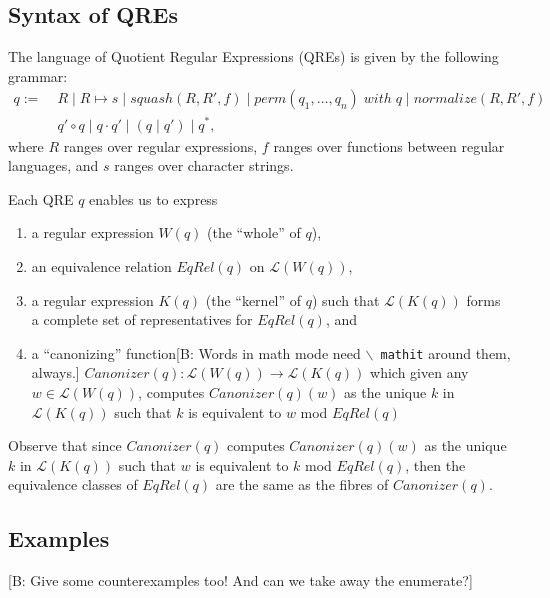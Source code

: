 \documentclass{svproc}
\newcommand{\FINISH}[3]{\ifdraft\textcolor{#1}{[#2: #3]}\fi}
\newcommand{\bcp}[1]{\FINISH{dkred}{B}{#1}}
\newcommand{\squash}[3]{\ensuremath{\mathit{squash}(#1, #2, #3)}}
\newcommand{\perm}[2]{\ensuremath{\mathit{perm}(#1)\; \mathit{with}\; #2}}
\newcommand{\normalize}[3]{\ensuremath{\mathit{normalize}(#1, #2, #3)}}
\newcommand{\sep}{\ensuremath{\; | \;}}
\begin{document}
  \subsection{Syntax of QREs}
The language of Quotient Regular Expressions (QREs) is given by the following
grammar:
\begin{align*}
q := \; &R \sep R \mapsto s \sep \squash{R}{R'}{f} \sep
\perm{q_1, \ldots, q_n}{q} \;  | \; \normalize{R}{R'}{f}\\
&q' \circ q \sep q \cdot q' \sep (q \sep q') \sep q^*,
\end{align*}
where $R$ ranges over regular expressions, $f$ ranges over functions between
regular languages, and $s$ ranges over character strings.

Each QRE $q$ enables us to express
\begin{enumerate}
  \item a regular expression $W(q)$ (the ``whole'' of $q$),
  \item an equivalence relation $EqRel(q)$ on $\mathcal{L}(W(q))$,
  \item a regular expression $K(q)$ (the ``kernel'' of $q$)
  such that $\mathcal{L}(K(q))$ forms a complete set of representatives for
  $EqRel(q)$, and
  \item a ``canonizing'' function\bcp{Words in math mode need $\backslash${\tt
      mathit} around them, always.} $Canonizer(q):\mathcal{L}(W(q))
  \longrightarrow \mathcal{L}(K(q))$ which given any $w \in \mathcal{L}(W(q))$,
  computes $Canonizer(q)(w)$ as the unique $k$ in $\mathcal{L}(K(q))$ such that
  $k$ is equivalent to $w$ mod $EqRel(q)$
  \end{enumerate}
  Observe that since $Canonizer(q)$ computes $Canonizer(q)(w)$ as the unique $k$
  in $\mathcal{L}(K(q))$ such that $w$ is equivalent to $k$ mod $EqRel(q)$,
  then the equivalence classes of $EqRel(q)$ are the same as the fibres of
  $Canonizer(q)$.

  \subsection{Examples}

\bcp{Give some counterexamples too!  And can we take away the enumerate?}
\end{document}

